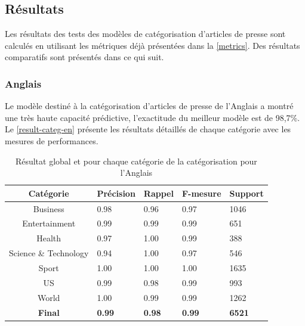 \subsection{Résultats}\label{result-categ}
    Les résultats des tests des modèles de catégorisation d'articles de presse sont calculés en utilisant les métriques déjà présentées dans la \autoref{metrics}. Des résultats comparatifs sont présentés dans ce qui suit.
    \subsubsection{Anglais}
    Le modèle destiné à la catégorisation d'articles de presse de l'Anglais a montré une très haute capacité prédictive, l'exactitude du meilleur modèle est de 98,7\%. Le \autoref{result-categ-en} présente les résultats détaillés de chaque catégorie avec les mesures de performances.
    \begin{table}[H]
        \begin{center}
            \begin{tabular}{|c|C{2cm}|C{2cm}|C{2cm}|C{2cm}|}
                \hline
                \textbf{Catégorie} &  \textbf{Précision} &  \textbf{Rappel} &  \textbf{F-mesure} &  \textbf{Support} \\
                \hline
                Business & 0.98 & 0.96 & 0.97 & 1046 \\
                Entertainment & 0.99 & 0.99 & 0.99 & 651 \\
                Health & 0.97 & 1.00 & 0.99 & 388 \\
                Science \& Technology & 0.94 & 1.00 & 0.97 & 546 \\
                Sport & 1.00 & 1.00 & 1.00 & 1635 \\
                US & 0.99 & 0.98 & 0.99 & 993 \\
                World & 1.00 & 0.99 & 0.99 & 1262 \\                          
                \textbf{Final} & \textbf{0.99} & \textbf{0.98} & \textbf{0.99} & \textbf{6521} \\
                \hline
            \end{tabular}
        \end{center}
        \caption{Résultat global et pour chaque catégorie de la catégorisation pour l'Anglais}
        \label{result-categ-en}
    \end{table}


